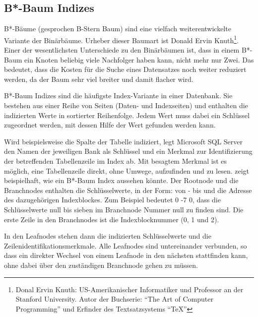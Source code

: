       \subsection{B*-Baum Indizes}
        B*-B\"aume (gesprochen B-Stern Baum) sind eine vielfach
        weiterentwickelte Variante der Bin\"arb\"aume. Urheber dieser Baumart
        ist Donald Ervin Knuth\footnote{Donal Ervin Knuth: US-Amerikanischer
        Informatiker und Professor an der Stanford University. Autor der
        Buchserie: \enquote{The Art of Computer Programming} und Erfinder des
        Textsatzsystems \enquote{\TeX}}. Einer der wesentlichsten Unterschiede
        zu den Bin\"arb\"aumen ist, dass in einem B*-Baum ein Knoten beliebig
        viele Nachfolger haben kann, nicht mehr nur Zwei. Das bedeutet, dass
        die Kosten f\"ur die Suche eines Datensatzes noch weiter reduziert
        werden, da der Baum sehr viel breiter und damit flacher wird.

        B*-Baum Indizes sind die h\"aufigste Index-Variante in einer
        Datenbank. Sie bestehen aus einer Reihe von Seiten (Daten- und
        Indexseiten) und enthalten die indizierten Werte in sortierter
        Reihenfolge. Jedem Wert muss dabei ein Schl\"ussel zugeordnet werden,
        mit dessen Hilfe der Wert gefunden werden kann.

       Wird beispielsweise die Spalte  der Tabelle
        indiziert, legt Microsoft SQL Server den Namen der
       jeweiligen Bank als Schl\"ussel und ein Merkmal zur Identifizierung
       der betreffenden Tabellenzeile im Index ab. Mit besagtem Merkmal ist
       es möglich, eine Tabellenzeile direkt, ohne Umwege, aufzufinden und zu
       lesen.
         zeigt beispielhaft, wie ein B*-Baum Index aussehen
        k\"onnte.
        Der Rootnode und die Branchnodes enthalten die Schl\"usselwerte, in
        der Form: von - bis und die Adresse des dazugeh\"origen Indexblockes.
        Zum Beispiel bedeutet 0 -7 0, dass die Schl\"usselwerte null bis
        sieben im Branchnode Nummer null zu finden sind. Die erste Zeile in
        den Branchnodes ist die Indexblocknummer (0, 1 und 2).

        In den Leafnodes stehen dann die indizierten Schl\"usselwerte und die
        Zeilenidentifikationsmerkmale. Alle Leafnodes sind untereinander
        verbunden, so dass ein direkter Wechsel von einem Leafnode in den
        n\"achsten stattfinden kann, ohne dabei \"uber den zust\"andigen
        Branchnode gehen zu m\"ussen.
